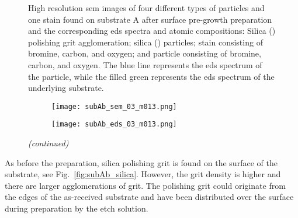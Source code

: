 \begin{figure}
\begin{subfigure}[t]{\textwidth}
\begin{minipage}[t]{0.11\linewidth}
            \centering
            \atomicTable[&][&][&]
          \end{minipage}
        \caption{}\label{fig:subAb_br-stain}
    \end{subfigure}
    \caption[\Ac{sem} images, \ac{eds} spectra, and \ac{eds} atomic compositions of three different types of particles and one type of stain found on substrate A after surface pre-growth preparation.]{High resolution \acf{sem} images of four different types of particles and one stain found on substrate A after surface pre-growth preparation and the corresponding \acf{eds} spectra and atomic compositions:  Silica () polishing grit agglomeration;  silica () particles;  stain consisting of bromine, carbon, and oxygen; and  particle consisting of bromine, carbon, and oxygen. The blue line represents the \ac{eds} spectrum of the particle, while the filled green represents the \ac{eds} spectrum of the underlying substrate.}\label{fig:subAb_sem_w_eds}
\end{figure}
%
\begin{figure}[htbp]
\ContinuedFloat
    \centering
    \begin{subfigure}[t]{\textwidth}
          \begin{minipage}[t]{0.43\linewidth}
            \centering
            \texttt{[image: subAb\_sem\_03\_m013.png]}
          \end{minipage}
          \hfill
          \begin{minipage}[t]{0.43\linewidth}
            \centering
            \texttt{[image: subAb\_eds\_03\_m013.png]}
          \end{minipage}
          \begin{minipage}[t]{0.11\linewidth}
            \centering
            \atomicTable[&][&][&]
          \end{minipage}
        \caption{}\label{fig:subAb_br-particle}
    \end{subfigure}
    \captionsetup{list=no}
    \caption{\emph{(continued)}}
\end{figure}

As before the preparation, silica polishing grit is found on the surface of the substrate, see Fig.~\ref{fig:subAb_silica}. However, the grit density is higher and there are larger agglomerations of grit. The polishing grit could originate from the edges of the as-received substrate and have been distributed over the surface during preparation by the etch solution.

